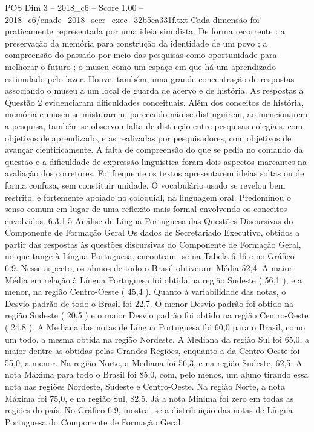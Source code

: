 \begin{textsample}{POS Dim 3 – 2018\_c6 – Score 1.00 – 2018\_c6/enade\_2018\_secr\_exec\_32b5ea331f.txt}
Cada dimensão foi praticamente representada por uma ideia simplista.
De forma recorrente : a preservação da memória para construção da identidade de um povo ; a compreensão do passado por meio das pesquisas como oportunidade para melhorar o futuro ; o museu como um espaço em que há um aprendizado estimulado pelo lazer.
Houve, também, uma grande concentração de respostas associando o museu a um local de guarda de acervo e de história.
As respostas à Questão 2 evidenciaram dificuldades conceituais.
Além dos conceitos de história, memória e museu se misturarem, parecendo não se distinguirem, ao mencionarem a pesquisa, também se observou falta de distinção entre pesquisas colegiais, com objetivos de aprendizado, e as realizadas por pesquisadores, com objetivos de avançar cientificamente.
A falta de compreensão do que se pedia no comando da questão e a dificuldade de expressão linguística foram dois aspectos marcantes na avaliação dos corretores.
Foi frequente os textos apresentarem ideias soltas ou de forma confusa, sem constituir unidade.
O vocabulário usado se revelou bem restrito, e fortemente apoiado no coloquial, na linguagem oral.
Predominou o senso comum em lugar de uma reflexão mais formal envolvendo os conceitos envolvidos. 6.3.1.5 Análise de Língua Portuguesa das Questões Discursivas do Componente de Formação Geral Os dados de Secretariado Executivo, obtidos a partir das respostas às questões discursivas do Componente de Formação Geral, no que tange à Língua Portuguesa, encontram -se na Tabela 6.16 e no Gráfico 6.9.
Nesse aspecto, os alunos de todo o Brasil obtiveram Média 52,4.
A maior Média em relação à Língua Portuguesa foi obtida na região Sudeste ( 56,1 ), e a menor, na região Centro-Oeste ( 45,4 ).
Quanto à variabilidade das notas, o Desvio padrão de todo o Brasil foi 22,7.
O menor Desvio padrão foi obtido na região Sudeste ( 20,5 ) e o maior Desvio padrão foi obtido na região Centro-Oeste ( 24,8 ).
A Mediana das notas de Língua Portuguesa foi 60,0 para o Brasil, como um todo, a mesma obtida na região Nordeste.
A Mediana da região Sul foi 65,0, a maior dentre as obtidas pelas Grandes Regiões, enquanto a da Centro-Oeste foi 55,0, a menor.
Na região Norte, a Mediana foi 56,3, e na região Sudeste, 62,5.
A nota Máxima para todo o Brasil foi 85,0, com, pelo menos, um aluno tirando essa nota nas regiões Nordeste, Sudeste e Centro-Oeste.
Na região Norte, a nota Máxima foi 75,0, e na região Sul, 82,5.
Já a nota Mínima foi zero em todas as regiões do país.
No Gráfico 6.9, mostra -se a distribuição das notas de Língua Portuguesa do Componente de Formação Geral.

\end{textsample}
